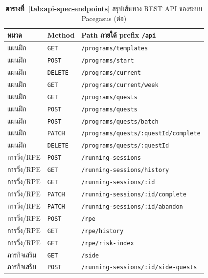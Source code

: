 \clearpage

\begin{table}[H]
\centering
\captionsetup{justification=centering,singlelinecheck=true}
\setlength{\tabcolsep}{3pt}
\renewcommand{\arraystretch}{1.08}
\caption*{\textbf{ตารางที่~\ref{tab:api-spec-endpoints}} สรุปเส้นทาง REST API ของระบบ Pacegasus (ต่อ)}
\begin{tabular}{|>{\raggedright\arraybackslash\normalsize}p{}|>{\raggedright\arraybackslash\normalsize}p{}|>{\raggedright\arraybackslash\fontsize{9.25}{11.5}\selectfont}p{}|}
\hline
\textbf{หมวด} & \textbf{Method} & \textbf{Path ภายใต้ prefix \texttt{/api}} \\ \hline
แผนฝึก & \texttt{GET} & \texttt{/programs/templates} \\
แผนฝึก & \texttt{POST} & \texttt{/programs/start} \\
แผนฝึก & \texttt{DELETE} & \texttt{/programs/current} \\
แผนฝึก & \texttt{GET} & \texttt{/programs/current/week} \\
แผนฝึก & \texttt{GET} & \texttt{/programs/quests} \\
แผนฝึก & \texttt{POST} & \texttt{/programs/quests} \\
แผนฝึก & \texttt{POST} & \texttt{/programs/quests/batch} \\
แผนฝึก & \texttt{PATCH} & \texttt{/programs/quests/:questId/complete} \\
แผนฝึก & \texttt{DELETE} & \texttt{/programs/quests/:questId} \\
การวิ่ง/RPE & \texttt{POST} & \texttt{/running-sessions} \\
การวิ่ง/RPE & \texttt{GET} & \texttt{/running-sessions/history} \\
การวิ่ง/RPE & \texttt{GET} & \texttt{/running-sessions/:id} \\
การวิ่ง/RPE & \texttt{PATCH} & \texttt{/running-sessions/:id/complete} \\
การวิ่ง/RPE & \texttt{PATCH} & \texttt{/running-sessions/:id/abandon} \\
การวิ่ง/RPE & \texttt{POST} & \texttt{/rpe} \\
การวิ่ง/RPE & \texttt{GET} & \texttt{/rpe/history} \\
การวิ่ง/RPE & \texttt{GET} & \texttt{/rpe/risk-index} \\
ภารกิจเสริม & \texttt{GET} & \texttt{/side} \\
ภารกิจเสริม & \texttt{POST} & \texttt{/running-sessions/:id/side-quests} \\

\end{tabular}
\end{table}
